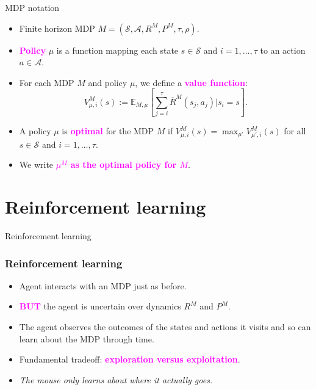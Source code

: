 \documentclass{beamer}
\newlength{\wideitemsep}
\let\olditem\item
\renewcommand{\item}{\setlength{\itemsep}{\wideitemsep}\olditem}
\newcommand{\Exp}{\mathds{E}}
\newcommand{\Sc}{\mathcal{S}}
\newcommand{\Ac}{\mathcal{A}}
\newcommand{\bspace}{\vspace{3mm}}
\newcommand{\hilite}[1]{\textcolor{magenta}{\textbf{#1}}}
\begin{document}
\begin{frame}{MDP notation}
\begin{itemize}
    \item Finite horizon MDP $M = (\Sc, \Ac, R^M, P^M, \tau, \rho)$.
    \bspace
    \item \hilite{Policy} $\mu$ is a function mapping each state $s \in \Sc$ and $i = 1,\ldots,\tau$ to an action $a \in \Ac$.
    \bspace
    \item For each MDP $M$ and policy $\mu$, we define a \hilite{value function}:
$$V^{M}_{\mu, i}(s) := \Exp_{M,\mu}\left[ \sum_{j=i}^{\tau} \overline{R}^M(s_j,a_j) \Big| s_i = s \right].$$
    \item A policy $\mu$ is \hilite{optimal} for the MDP $M$ if $V^{M}_{\mu, i}(s) = \max_{\mu'} V^{M}_{\mu', i}(s)$ for all $s \in \Sc$ and $i=1,\ldots,\tau$.
    \bspace
    \item We write \hilite{$\mu^M$ as the optimal policy for $M$}.
\end{itemize}
\end{frame}

\section{Reinforcement learning}

\begin{frame}
\begin{block}{\Huge{Reinforcement learning}}
\end{block}
\end{frame}


\begin{frame}
\frametitle{Reinforcement learning}
\begin{itemize}
    \item Agent interacts with an MDP just as before.
    \bspace
    \item \hilite{BUT} the agent is uncertain over dynamics $R^M$ and $P^M$. \\
    \bspace
    \item The agent observes the outcomes of the states and actions it visits and so can learn about the MDP through time.
    \bspace
    \item Fundamental tradeoff: \pause \hilite{exploration versus exploitation}.
    \pause
    \bspace
    \item \emph{The mouse only learns about where it actually goes.}
\end{itemize}
\end{frame}
\end{document}
